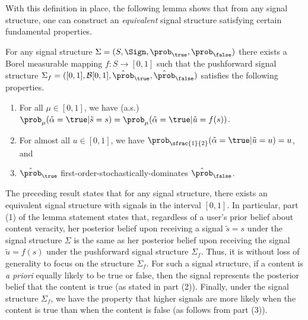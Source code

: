 With this definition in place, the following lemma shows that from any signal structure, one can construct an {\em equivalent} signal structure satisfying certain fundamental properties. 
\begin{lemma}\label{lem:sign_equiv}
  For any signal structure $\Sigma = (S, \Sign, \prob_\true, \prob_\false)$  there exists a Borel measurable mapping $f : S \to [0,1]$ such that the pushforward signal structure  $\Sigma_f = ([0,1], \mathcal{B}[0,1], \hat{\prob}_\true, \hat{\prob}_\false)$ satisfies the following properties. 
  \begin{enumerate}
    \item For all $\mu \in [0,1]$, we have (a.s.) $\prob_\mu(\tilde{\alpha} = \true | \tilde{s} = s) = \prob_\mu ( \tilde{\alpha} = \true | \tilde{u} = f(s))$.
      \item For almost all $u \in [0,1]$, we have $\prob_{\sfrac{1}{2}} (\tilde{\alpha} = \true |\tilde{u}=u)=u$, and
      \item $\hat{\prob}_\true$ first-order-stochastically-dominates $\hat{\prob}_\false$.
  \end{enumerate}
\end{lemma}
The preceding result states that for any signal structure, there exists an equivalent signal structure with signals in the interval $[0,1]$. In particular, part (1) of the lemma statement states that, regardless of a user's prior belief about content veracity, her posterior belief upon receiving a signal $\tilde{s} = s$ under the signal structure $\Sigma$ is the same as her posterior belief upon receiving the signal $\tilde{u} = f(s)$ under the pushforward signal structure $\Sigma_f$. Thus, it is without loss of generality to focus on the structure $\Sigma_f$. For such a signal structure, if a content is {\em a priori} equally likely to be true or false, then the signal represents the posterior belief that the content is true (as stated in part (2)).  Finally, under the signal structure $\Sigma_f$, we have the property that higher signals are more likely when the content is true than when the content is false (as follows from part (3)). 

